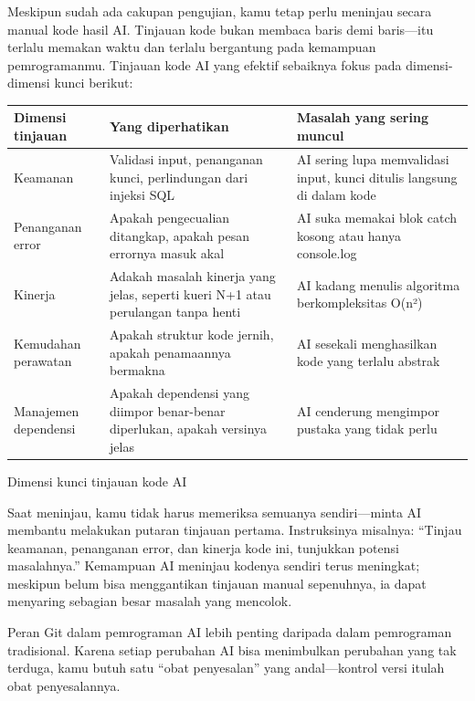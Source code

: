 
Meskipun sudah ada cakupan pengujian, kamu tetap perlu meninjau secara manual kode hasil AI. Tinjauan kode bukan membaca baris demi baris—itu terlalu memakan waktu dan terlalu bergantung pada kemampuan pemrogramanmu. Tinjauan kode AI yang efektif sebaiknya fokus pada dimensi-dimensi kunci berikut:

\begin{center}
\begin{tabularx}{\linewidth}{|X|X|X|}
\hline
\textbf{Dimensi tinjauan} & \textbf{Yang diperhatikan} & \textbf{Masalah yang sering muncul} \tabularnewline
\hline
Keamanan & Validasi input, penanganan kunci, perlindungan dari injeksi SQL & AI sering lupa memvalidasi input, kunci ditulis langsung di dalam kode \tabularnewline
Penanganan error & Apakah pengecualian ditangkap, apakah pesan errornya masuk akal & AI suka memakai blok catch kosong atau hanya console.log \tabularnewline
Kinerja & Adakah masalah kinerja yang jelas, seperti kueri N+1 atau perulangan tanpa henti & AI kadang menulis algoritma berkompleksitas O(n²) \tabularnewline
Kemudahan perawatan & Apakah struktur kode jernih, apakah penamaannya bermakna & AI sesekali menghasilkan kode yang terlalu abstrak \tabularnewline
Manajemen dependensi & Apakah dependensi yang diimpor benar-benar diperlukan, apakah versinya jelas & AI cenderung mengimpor pustaka yang tidak perlu \tabularnewline
\hline
\end{tabularx}
\end{center}

\begin{center}\small\color{gray}Dimensi kunci tinjauan kode AI\end{center}

Saat meninjau, kamu tidak harus memeriksa semuanya sendiri—minta AI membantu melakukan putaran tinjauan pertama. Instruksinya misalnya: “Tinjau keamanan, penanganan error, dan kinerja kode ini, tunjukkan potensi masalahnya.” Kemampuan AI meninjau kodenya sendiri terus meningkat; meskipun belum bisa menggantikan tinjauan manual sepenuhnya, ia dapat menyaring sebagian besar masalah yang mencolok.


Peran Git dalam pemrograman AI lebih penting daripada dalam pemrograman tradisional. Karena setiap perubahan AI bisa menimbulkan perubahan yang tak terduga, kamu butuh satu “obat penyesalan” yang andal—kontrol versi itulah obat penyesalannya.

